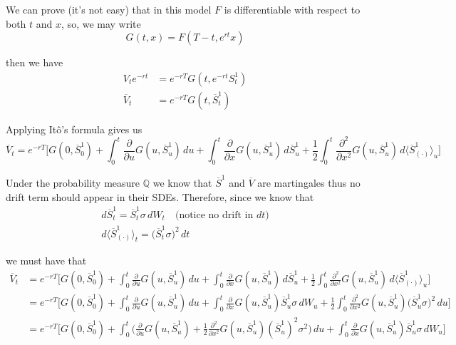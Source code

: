 \documentclass[12pt]{article}
\newlength\tindent
\renewcommand{\indent}{\hspace*{\tindent}}
\begin{document}
We can prove (it's not easy) that in this model $F$ is differentiable with respect to both $t$ and $x$, so, we may write
\begin{equation*}
	G(t,x) = F(T - t, e^{rt}x)
\end{equation*}

then we have
\begin{align*}
	V_te^{-rt} &= e^{-rT}G(t, e^{-rt}S^1_t) \\
	\overline{V}_t &= e^{-rT}G(t, \overline{S}^1_t)
\end{align*}

Applying It\^{o}'s formula gives us
\begin{equation*}
	\overline{V}_t = e^{-rT}\Bigg[G(0, \overline{S}^1_0) + \int^t_0 \frac{\partial}{\partial u} G(u, \overline{S}^1_u)\,du + \int^t_0 \frac{\partial}{\partial x} G(u, \overline{S}^1_u)\,d\overline{S}^1_u + \frac{1}{2}\int^t_0 \frac{\partial^2}{\partial x^2} G(u, \overline{S}^1_u)\,d\langle \overline{S}^1_{(\cdot)} \rangle_u \Bigg]
\end{equation*}

\indent Under the probability measure $\mathbb Q$ we know that $\overline{S}^1$ and $\overline{V}$ are martingales thus no drift term should appear in their SDEs. Therefore, since we know that
\begin{align*}
	d\overline{S}^1_t = \overline{S}^1_t\sigma\,dW_t \quad \text{(notice no drift in $dt$)} \\
	d\langle \overline{S}^1_{(\cdot)} \rangle_t = \big(\overline{S}^1_t\sigma\big)^2\,dt
\end{align*}

we must have that
\begin{align*}
	\overline{V}_t &= e^{-rT}\Bigg[G(0, \overline{S}^1_0) + \int^t_0 \frac{\partial}{\partial u} G(u, \overline{S}^1_u)\,du + \int^t_0 \frac{\partial}{\partial x} G(u, \overline{S}^1_u)\,d\overline{S}^1_u + \frac{1}{2}\int^t_0 \frac{\partial^2}{\partial x^2} G(u, \overline{S}^1_u)\,d\langle \overline{S}^1_{(\cdot)} \rangle_u \Bigg] \\
	&= e^{-rT}\Bigg[G(0, \overline{S}^1_0) + \int^t_0 \frac{\partial}{\partial u} G(u, \overline{S}^1_u)\,du + \int^t_0 \frac{\partial}{\partial x} G(u, \overline{S}^1_u)\overline{S}^1_u\sigma\,dW_u + \frac{1}{2}\int^t_0 \frac{\partial^2}{\partial x^2} G(u, \overline{S}^1_u)\big(\overline{S}^1_u\sigma\big)^2\,du \Bigg] \\
	&= e^{-rT}\Bigg[G(0, \overline{S}^1_0) + \int^t_0 \Bigg(\frac{\partial}{\partial u} G(u, \overline{S}^1_u) + \frac{1}{2}\frac{\partial^2}{\partial x^2} G(u, \overline{S}^1_u)(\overline{S}^1_u)^2\sigma^2\Bigg)\,du + \int^t_0 \frac{\partial}{\partial x} G(u, \overline{S}^1_u)\overline{S}^1_u\sigma\,dW_u\Bigg] \\
\end{align*}
\end{document}
